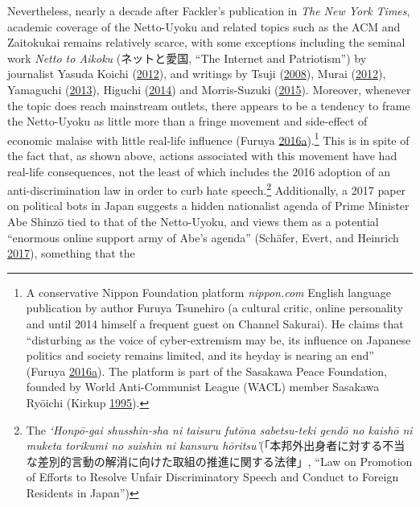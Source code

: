 \documentclass[10pt,british,A4paper,,openany]{memoir}
\begin{document}
Nevertheless, nearly a decade after Fackler's publication in \emph{The
New York Times}, academic coverage of the Netto-Uyoku and related topics
such as the ACM and Zaitokukai remains relatively scarce, with some
exceptions including the seminal work \emph{Netto to Aikoku}
(ネットと愛国, ``The Internet and Patriotism'') by journalist Yasuda
Koichi (\protect\hyperlink{ref-yasuda_eng:_2012}{2012}), and writings by
Tsuji (\protect\hyperlink{ref-tsuji_eng:_2008}{2008}), Murai
(\protect\hyperlink{ref-murai_net_2012}{2012}), Yamaguchi
(\protect\hyperlink{ref-yamaguchi_xenophobia_2013}{2013}), Higuchi
(\protect\hyperlink{ref-higuchi_japans_2014}{2014}) and Morris-Suzuki
(\protect\hyperlink{ref-morris-suzuki_beyond_2015}{2015}). Moreover,
whenever the topic does reach mainstream outlets, there appears to be a
tendency to frame the Netto-Uyoku as little more than a fringe movement
and side-effect of economic malaise with little real-life influence
(Furuya
\protect\hyperlink{ref-furuya_roots_2016}{2016}\protect\hyperlink{ref-furuya_roots_2016}{a}).\footnote{A
  conservative Nippon Foundation platform \emph{nippon.com} English
  language publication by author Furuya Tsunehiro (a cultural critic,
  online personality and until 2014 himself a frequent guest on Channel
  Sakurai). He claims that ``disturbing as the voice of cyber-extremism
  may be, its influence on Japanese politics and society remains
  limited, and its heyday is nearing an end'' (Furuya
  \protect\hyperlink{ref-furuya_roots_2016}{2016}\protect\hyperlink{ref-furuya_roots_2016}{a}).
  The platform is part of the Sasakawa Peace Foundation, founded by
  World Anti-Communist League (WACL) member Sasakawa Ryōichi (Kirkup
  \protect\hyperlink{ref-kirkup_obituary:_1995}{1995}).} This is in
spite of the fact that, as shown above, actions associated with this
movement have had real-life consequences, not the least of which
includes the 2016 adoption of an anti-discrimination law in order to
curb hate speech.\footnote{The \emph{`Honpō-gai shusshin-sha ni taisuru
  futōna sabetsu-teki gendō no kaishō ni muketa torikumi no suishin ni
  kansuru
  hōritsu'}(「本邦外出身者に対する不当な差別的言動の解消に向けた取組の推進に関する法律」,
  ``Law on Promotion of Efforts to Resolve Unfair Discriminatory Speech
  and Conduct to Foreign Residents in Japan'')} Additionally, a 2017
paper on political bots in Japan suggests a hidden nationalist agenda of
Prime Minister Abe Shinzō tied to that of the Netto-Uyoku, and views
them as a potential ``enormous online support army of Abe's agenda''
(Schäfer, Evert, and Heinrich
\protect\hyperlink{ref-schafer_japans_2017}{2017}), something that the
\end{document}
